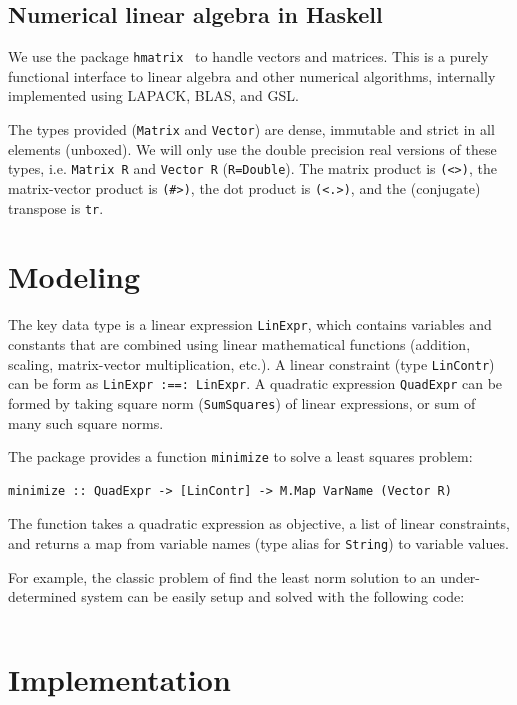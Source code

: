 \documentclass[12pt]{article}
\begin{document}
\subsection{Numerical linear algebra in Haskell}

We use the package \verb|hmatrix|~\cite{ruiz2015hmatrix-0.17.0.1} to handle
vectors and matrices.
This is a purely functional interface to linear algebra and other numerical
algorithms, internally implemented using LAPACK, BLAS, and GSL.

The types provided (\verb|Matrix| and \verb|Vector|) are dense, immutable and
strict in all elements (unboxed).
We will only use the double precision real versions of these types, i.e.
\verb|Matrix R| and \verb|Vector R| (\verb|R=Double|).
The matrix product is \verb|(<>)|, the matrix-vector product is \verb|(#>)|, the
dot product is \verb|(<.>)|, and the (conjugate) transpose is \verb|tr|.

\section{Modeling}

The key data type is a linear expression \verb|LinExpr|, which contains
variables and constants that are combined using linear mathematical functions
(addition, scaling, matrix-vector multiplication, etc.).
A linear constraint (type \verb|LinContr|) can be form as
\verb|LinExpr :==: LinExpr|.
A quadratic expression \verb|QuadExpr| can be formed by taking square norm
(\verb|SumSquares|) of linear expressions, or sum of many such square norms.

The package provides a function \verb|minimize| to solve a least squares problem:
\begin{verbatim}
minimize :: QuadExpr -> [LinContr] -> M.Map VarName (Vector R)
\end{verbatim}
The function takes a quadratic expression as objective, a list of linear
constraints, and returns a map from variable names (type alias for
\verb|String|) to variable values.

For example, the classic problem of find the least norm solution to an
under-determined system can be easily setup and solved with the following code:
\inputminted{haskell}{app/example_least_norm.hs}

\section{Implementation}
\end{document}
